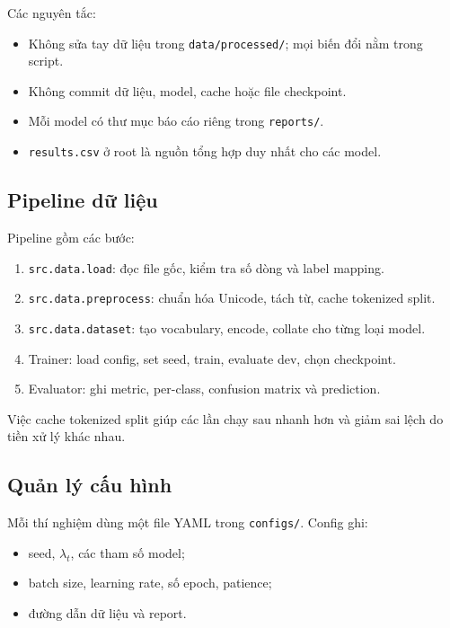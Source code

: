 \documentclass[12pt,a4paper]{report}
\begin{document}
Các nguyên tắc:

\begin{itemize}[leftmargin=1.2cm]
  \item Không sửa tay dữ liệu trong \texttt{data/processed/}; mọi biến đổi nằm trong script.
  \item Không commit dữ liệu, model, cache hoặc file checkpoint.
  \item Mỗi model có thư mục báo cáo riêng trong \texttt{reports/}.
  \item \texttt{results.csv} ở root là nguồn tổng hợp duy nhất cho các model.
\end{itemize}

\subsection{Pipeline dữ liệu}

Pipeline gồm các bước:

\begin{enumerate}[leftmargin=1.2cm]
  \item \texttt{src.data.load}: đọc file gốc, kiểm tra số dòng và label mapping.
  \item \texttt{src.data.preprocess}: chuẩn hóa Unicode, tách từ, cache tokenized split.
  \item \texttt{src.data.dataset}: tạo vocabulary, encode, collate cho từng loại model.
  \item Trainer: load config, set seed, train, evaluate dev, chọn checkpoint.
  \item Evaluator: ghi metric, per-class, confusion matrix và prediction.
\end{enumerate}

Việc cache tokenized split giúp các lần chạy sau nhanh hơn và giảm sai lệch do tiền xử lý khác nhau.

\subsection{Quản lý cấu hình}

Mỗi thí nghiệm dùng một file YAML trong \texttt{configs/}. Config ghi:

\begin{itemize}[leftmargin=1.2cm]
  \item seed, \(\lambda_t\), các tham số model;
  \item batch size, learning rate, số epoch, patience;
  \item đường dẫn dữ liệu và report.
\end{itemize}
\end{document}
